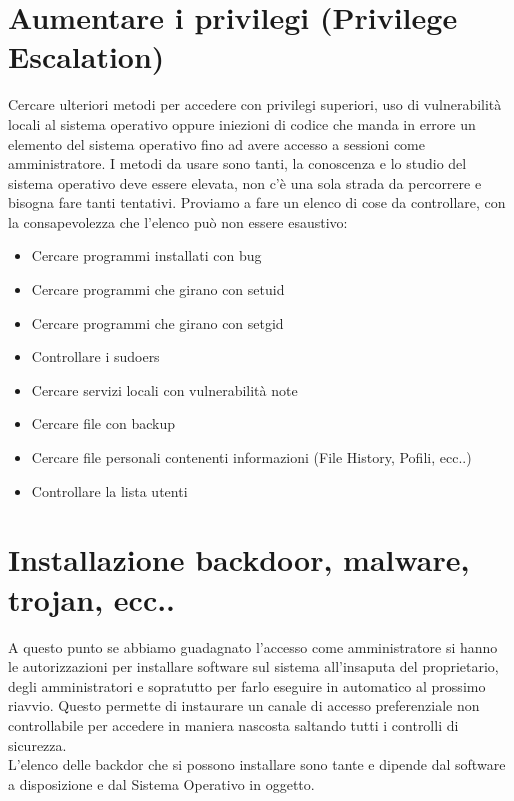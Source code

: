 \documentclass[a4paper,12pt]{article}
\begin{document}
\section{  Aumentare i privilegi (Privilege Escalation) }

Cercare ulteriori metodi per accedere con privilegi superiori, uso di vulnerabilità locali  al sistema operativo oppure iniezioni di codice che manda in  errore un elemento del sistema operativo fino ad avere accesso a sessioni come amministratore. I metodi da usare sono tanti, la conoscenza e lo studio del sistema operativo deve essere elevata, non c'è una sola strada da percorrere e bisogna fare tanti tentativi. 
Proviamo a fare un elenco di cose da controllare, con la consapevolezza che l'elenco può non essere esaustivo:\\
\begin{itemize}
   
  \item Cercare programmi installati con bug
  \item Cercare programmi che girano con setuid
  \item Cercare programmi che girano con setgid
  \item Controllare i sudoers
  \item Cercare servizi locali con vulnerabilità note
  \item Cercare file con backup 
  \item Cercare file personali contenenti informazioni (File History, Pofili, ecc..)
  \item Controllare la lista utenti
  
\end{itemize}

\section{  Installazione backdoor, malware, trojan, ecc..}

A questo punto se abbiamo guadagnato l'accesso come amministratore si hanno le autorizzazioni per installare software sul sistema all'insaputa del proprietario, degli amministratori e sopratutto per farlo eseguire in automatico al prossimo riavvio. Questo permette di instaurare un canale di accesso preferenziale non controllabile per accedere in maniera nascosta saltando tutti i controlli di sicurezza. \\
L'elenco delle backdor che si possono installare sono tante e dipende dal software a disposizione e dal Sistema Operativo in oggetto.
\end{document}
